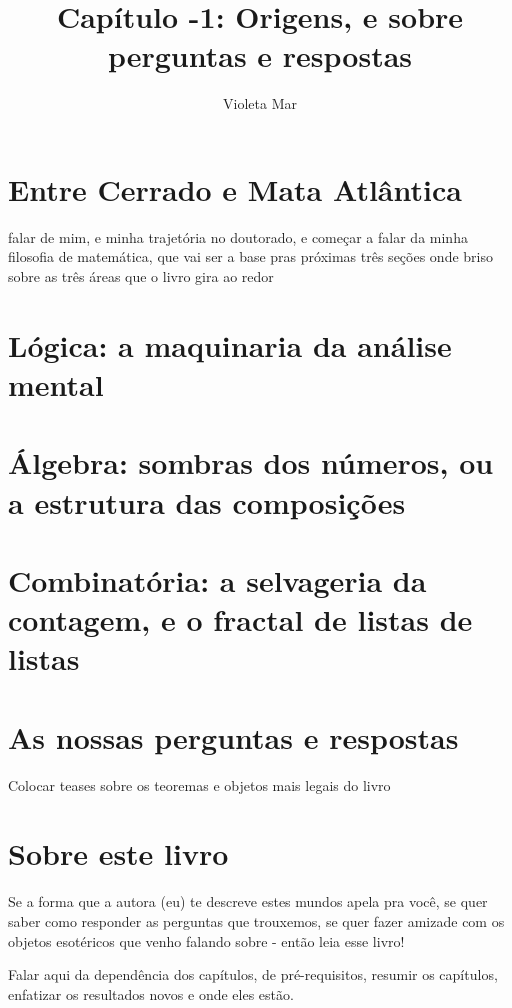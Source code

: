 \documentclass[11pt]{article}
\title{Capítulo -1: Origens, e sobre perguntas e respostas}
\author{Violeta Mar}
\date{}
\theoremstyle{definition}
\theoremstyle{definition}
\theoremstyle{definition}
\theoremstyle{definition}
\theoremstyle{definition}
\theoremstyle{definition}
\theoremstyle{definition}
\theoremstyle{definition}
\theoremstyle{definition}
\theoremstyle{definition}
\theoremstyle{definition}
\theoremstyle{definition}
\theoremstyle{definition}
\begin{document}
\maketitle

\section*{Entre Cerrado e Mata Atlântica}
falar de mim, e minha trajetória no doutorado, e começar a falar da minha filosofia de matemática, que vai ser a base pras próximas três seções onde briso sobre as três áreas que o livro gira ao redor

\section*{Lógica: a maquinaria da análise mental}

\section*{Álgebra: sombras dos números, ou a estrutura das composições}

\section*{Combinatória: a selvageria da contagem, e o fractal de listas de listas}

\section*{As nossas perguntas e respostas}
Colocar teases sobre os teoremas e objetos mais legais do livro

\section*{Sobre este livro}
Se a forma que a autora (eu) te descreve estes mundos apela pra você, se quer saber como responder as perguntas que trouxemos, se quer fazer amizade com os objetos esotéricos que venho falando sobre - então leia esse livro! 

Falar aqui da dependência dos capítulos, de pré-requisitos, resumir os capítulos, enfatizar os resultados novos e onde eles estão.
\end{document}
